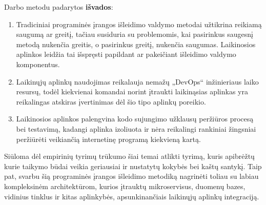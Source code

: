 \documentclass{VUMIFPSkursinis}
\begin{document}
\bigskip
Darbo metodu padarytos \textbf{išvados}:

\begin{enumerate}
  \item Tradiciniai programinės įrangos išleidimo valdymo metodai užtikrina reikiamą saugumą ar greitį, tačiau susiduria su problemomis, kai pasirinkus saugesnį metodą nukenčia greitis, o pasirinkus greitį, nukenčia saugumas. Laikinosios aplinkos leidžia tai išspręsti papildant ar pakeičiant išleidimo valdymo komponentus.
  \item Laikinųjų aplinkų naudojimas reikalauja nemažų „DevOps“ inžinieriaus laiko resursų, todėl kiekvienai komandai norint įtraukti laikinąsias aplinkas yra reikalingas atskiras įvertinimas dėl šio tipo aplinkų poreikio.
  \item Laikinosios aplinkos palengvina kodo sujungimo užklausų peržiūros procesą bei testavimą, kadangi aplinka izoliuota ir nėra reikalingi rankiniai žingsniai peržiūrėti veikiančią internetinę programą kiekvieną kartą.
\end{enumerate} 

 
Siūloma dėl empirinių tyrimų trūkumo šiai temai atlikti tyrimą, kuris apibrėžtų kurie taikymo būdai veikia geriausiai ir nustatytų kokybės bei kaštų santykį. Taip pat, svarbu šią programinės įrangos išleidimo metodiką nagrinėti toliau su labiau kompleksinėm architektūrom, kurios įtrauktų mikroservisus, duomenų bazes, vidinius tinklus ir kitas aplinkybės, apsunkinančiais laikinųjų aplinkų integraciją.

\printbibliography[heading=bibintoc,category=cited] %


\appendix  %
\end{document}
